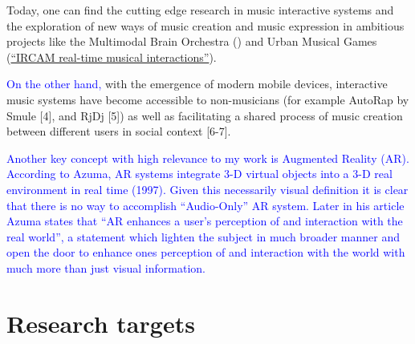 \documentclass[a4paper,11pt]{article}
\newcommand{\new}[1]{\textcolor{blue}{#1}}
\begin{document}
Today, one can find the cutting edge research in music interactive systems and the exploration of new ways of music creation and music expression in ambitious projects like the Multimodal Brain Orchestra (\href{http://specs.upf.edu/installation/2025}{}) and Urban Musical Games (\href{http://imtr.ircam.fr/imtr/IRCAM_Real-Time_Musical_Interactions}{``IRCAM real-time musical interactions''}).

\new{On the other hand, }with the emergence of modern mobile devices, interactive music systems have become accessible to non-musicians (for example AutoRap by Smule [4], and RjDj [5]) as well as facilitating a shared process of music creation between different users in social context [6-7].

\new{Another key concept with high relevance to my work is Augmented Reality (AR). According to Azuma, AR systems integrate 3-D virtual objects into a 3-D real environment in real time (1997). Given this necessarily visual definition it is clear that there is no way to accomplish ``Audio-Only'' AR system. Later in his article Azuma states that ``AR enhances a user's perception of and interaction with the real world'', a statement which lighten the subject in much broader manner and open the door to enhance ones perception of and interaction with the world with much more than just visual information.}

\section{Research targets}
\end{document}
